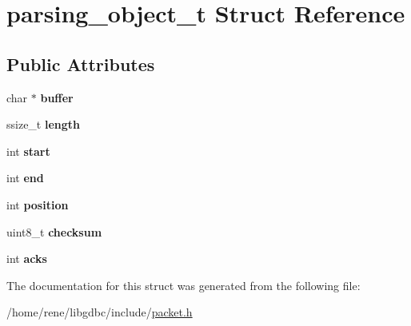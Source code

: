 \hypertarget{structparsing__object__t}{\section{parsing\-\_\-object\-\_\-t Struct Reference}
\label{structparsing__object__t}
}
\subsection*{Public Attributes}
\begin{DoxyCompactItemize}
\item 
\hypertarget{structparsing__object__t_ab36b53a565a7ca1979cc94dc46d8f061}{char $\ast$ {\bfseries buffer}}\label{structparsing__object__t_ab36b53a565a7ca1979cc94dc46d8f061}

\item 
\hypertarget{structparsing__object__t_a20638996fa7c25c351e2fa749c43e85e}{ssize\-\_\-t {\bfseries length}}\label{structparsing__object__t_a20638996fa7c25c351e2fa749c43e85e}

\item 
\hypertarget{structparsing__object__t_afe8f655e8d49c35e4dc78e10a853a3ad}{int {\bfseries start}}\label{structparsing__object__t_afe8f655e8d49c35e4dc78e10a853a3ad}

\item 
\hypertarget{structparsing__object__t_a3cdf78ce2105c2d92fd01c2a0016f89d}{int {\bfseries end}}\label{structparsing__object__t_a3cdf78ce2105c2d92fd01c2a0016f89d}

\item 
\hypertarget{structparsing__object__t_a6b2872ffdd56912ddb3e6151834ad8a0}{int {\bfseries position}}\label{structparsing__object__t_a6b2872ffdd56912ddb3e6151834ad8a0}

\item 
\hypertarget{structparsing__object__t_a09d93cb7f816bd32a1ec010e87de246c}{uint8\-\_\-t {\bfseries checksum}}\label{structparsing__object__t_a09d93cb7f816bd32a1ec010e87de246c}

\item 
\hypertarget{structparsing__object__t_ad348d6436fa47c61782454ff9cbbdd1c}{int {\bfseries acks}}\label{structparsing__object__t_ad348d6436fa47c61782454ff9cbbdd1c}

\end{DoxyCompactItemize}


The documentation for this struct was generated from the following file\-:\begin{DoxyCompactItemize}
\item 
/home/rene/libgdbc/include/\hyperlink{packet_8h}{packet.\-h}\end{DoxyCompactItemize}
